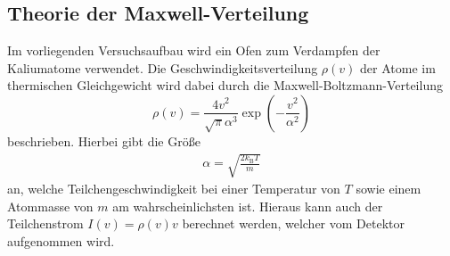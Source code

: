 \subsection{Theorie der Maxwell-Verteilung}

Im vorliegenden Versuchsaufbau wird ein Ofen zum Verdampfen der Kaliumatome verwendet.
Die Geschwindigkeitsverteilung $\rho(v)$ der Atome im thermischen Gleichgewicht wird dabei durch die Maxwell-Boltzmann-Verteilung
\begin{equation}
  \rho(v) = \frac{4 v^2}{\sqrt{\pi}\alpha^3} \exp{\left(-\frac{v^2}{\alpha^2} \right)}
\end{equation}
beschrieben.
Hierbei gibt die Größe
\begin{align*}
  \alpha = \sqrt{ \frac{2 k_\text{B} T}{m}}
\end{align*}
an, welche Teilchengeschwindigkeit bei einer Temperatur von $T$ sowie einem Atommasse von $m$ am wahrscheinlichsten ist.
Hieraus kann auch der Teilchenstrom $I(v) = \rho(v) v$ berechnet werden, welcher vom Detektor aufgenommen wird.
